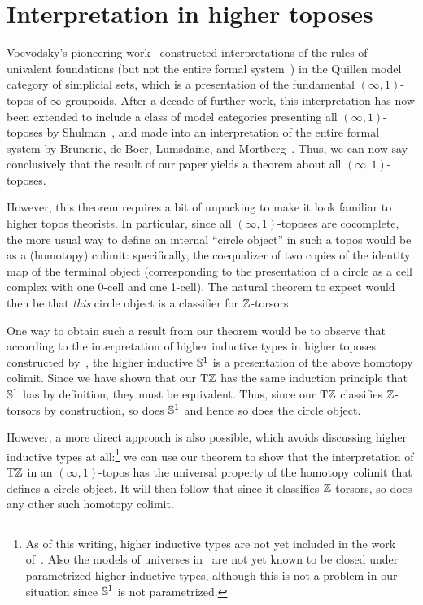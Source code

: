 \documentclass[a4paper,12pt]{amsart}
\begin{document}
\section{Interpretation in higher toposes}
\label{sec:topos}

Voevodsky's pioneering work~\cite{1211.2851} constructed interpretations of the rules of univalent foundations (but not the entire formal system~\cite{voevodsky:not-interp}) in the Quillen model category of simplicial sets, which is a presentation of the fundamental $(\infty,1)$-topos of $\infty$-groupoids.
After a decade of further work, this interpretation has now been extended to include a class of model categories presenting all $(\infty,1)$-toposes by Shulman~\cite{shulman:univinj}, and made into an interpretation of the entire formal system by Brunerie, de Boer, Lumsdaine, and M\"{o}rtberg~\cite{initiality}.
Thus, we can now say conclusively that the result of our paper yields a theorem about all $(\infty,1)$-toposes.

However, this theorem requires a bit of unpacking to make it look familiar to higher topos theorists.
In particular, since all $(\infty,1)$-toposes are cocomplete, the more usual way to define an internal ``circle object'' in such a topos would be as a (homotopy) colimit: specifically, the coequalizer of two copies of the identity map of the terminal object (corresponding to the presentation of a circle as a cell complex with one 0-cell and one 1-cell).
The natural theorem to expect would then be that \emph{this} circle object is a classifier for $\mathbb{Z}$-torsors.

One way to obtain such a result from our theorem would be to observe that according to the interpretation of higher inductive types in higher toposes constructed by~\cite{1705.07088}, the higher inductive ${\mathbb{S}^1}$ is a presentation of the above homotopy colimit.
Since we have shown that our ${\mathrm{T}\mathbb{Z}}$ has the same induction principle that ${\mathbb{S}^1}$ has by definition, they must be equivalent.
Thus, since our ${\mathrm{T}\mathbb{Z}}$ classifies $\mathbb{Z}$-torsors by construction, so does ${\mathbb{S}^1}$ and hence so does the circle object.

However, a more direct approach is also possible, which avoids discussing higher inductive types at all:\footnote{As of this writing, higher inductive types are not yet included in the work of~\cite{initiality}.  Also the models of universes in~\cite{shulman:univinj} are not yet known to be closed under parametrized higher inductive types, although this is not a problem in our situation since ${\mathbb{S}^1}$ is not parametrized.} we can use our theorem to show that the interpretation of ${\mathrm{T}\mathbb{Z}}$ in an $(\infty,1)$-topos has the universal property of the homotopy colimit that defines a circle object.
It will then follow that since it classifies $\mathbb{Z}$-torsors, so does any other such homotopy colimit.
\end{document}
